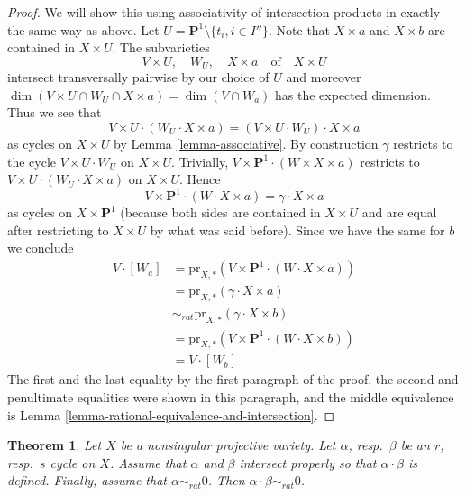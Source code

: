 \documentclass{stacks-project}
\theoremstyle{plain}
\newtheorem{theorem}[subsection]{Theorem}
\theoremstyle{definition}
\theoremstyle{remark}
\numberwithin{equation}{subsection}
\begin{document}
\begin{proof}
\medskip\noindent
We will show this using associativity of intersection products in exactly
the same way as above. Let $U = \mathbf{P}^1 \setminus \{t_i, i \in I''\}$.
Note that $X \times a$ and $X \times b$ are contained in $X \times U$.
The subvarieties
$$
V \times U,\quad W_U,\quad X \times a\quad\text{of}\quad X \times U
$$
intersect transversally pairwise by our choice of $U$ and moreover
$\dim(V \times U \cap W_U \cap X \times a) = \dim(V \cap W_a)$ has
the expected dimension. Thus we see that
$$
V \times U \cdot (W_U \cdot X \times a) =
(V \times U \cdot W_U) \cdot X \times a
$$
as cycles on $X \times U$ by Lemma \ref{lemma-associative}.
By construction $\gamma$ restricts to the cycle $V \times U \cdot W_U$
on $X \times U$. Trivially,
$V \times \mathbf{P}^1 \cdot (W \times X \times a)$ restricts
to $V \times U \cdot (W_U \cdot X \times a)$ on $X \times U$.
Hence
$$
V \times \mathbf{P}^1 \cdot (W \cdot X \times a) =
\gamma \cdot X \times a
$$
as cycles on $X \times \mathbf{P}^1$ (because both sides
are contained in $X \times U$ and are equal after restricting
to $X \times U$ by what was said before). Since we have the same for $b$
we conclude
\begin{align*}
V \cdot [W_a]
& =
\text{pr}_{X,*}(V \times \mathbf{P}^1 \cdot (W \cdot X\times a)) \\
& =
\text{pr}_{X, *}(\gamma \cdot X \times a) \\
& \sim_{rat} 
\text{pr}_{X, *}(\gamma \cdot X \times b) \\
& =
\text{pr}_{X,*}(V \times \mathbf{P}^1 \cdot (W \cdot X\times b)) \\
& =
V \cdot [W_b]
\end{align*}
The first and the last equality by the first paragraph of the proof,
the second and penultimate equalities were shown in this paragraph, and
the middle equivalence is
Lemma \ref{lemma-rational-equivalence-and-intersection}.
\end{proof}

\begin{theorem}
\label{theorem-well-defined}
Let $X$ be a nonsingular projective variety. Let $\alpha$, resp.\ $\beta$
be an $r$, resp.\ $s$ cycle on $X$. Assume that $\alpha$ and $\beta$
intersect properly so that $\alpha \cdot \beta$ is defined. Finally,
assume that $\alpha \sim_{rat} 0$. Then $\alpha \cdot \beta \sim_{rat} 0$.
\end{theorem}
\end{document}

